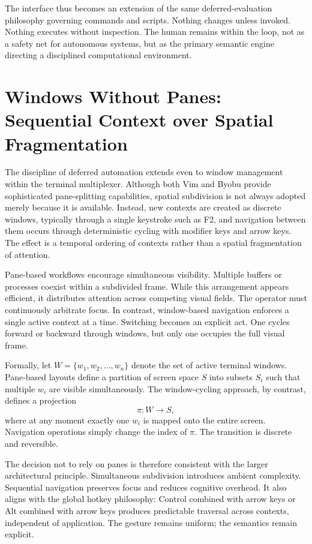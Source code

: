 \documentclass[11pt]{article}
\begin{document}
The interface thus becomes an extension of the same deferred-evaluation philosophy governing commands and scripts. Nothing changes unless invoked. Nothing executes without inspection. The human remains within the loop, not as a safety net for autonomous systems, but as the primary semantic engine directing a disciplined computational environment.

\section{Windows Without Panes: Sequential Context over Spatial Fragmentation}

The discipline of deferred automation extends even to window management within the terminal multiplexer. Although both Vim and Byobu provide sophisticated pane-splitting capabilities, spatial subdivision is not always adopted merely because it is available. Instead, new contexts are created as discrete windows, typically through a single keystroke such as F2, and navigation between them occurs through deterministic cycling with modifier keys and arrow keys. The effect is a temporal ordering of contexts rather than a spatial fragmentation of attention.

Pane-based workflows encourage simultaneous visibility. Multiple buffers or processes coexist within a subdivided frame. While this arrangement appears efficient, it distributes attention across competing visual fields. The operator must continuously arbitrate focus. In contrast, window-based navigation enforces a single active context at a time. Switching becomes an explicit act. One cycles forward or backward through windows, but only one occupies the full visual frame.

Formally, let \(W = \{w_1, w_2, \dots, w_n\}\) denote the set of active terminal windows. Pane-based layouts define a partition of screen space \(S\) into subsets \(S_i\) such that multiple \(w_i\) are visible simultaneously. The window-cycling approach, by contrast, defines a projection
\[
\pi : W \to S,
\]
where at any moment exactly one \(w_i\) is mapped onto the entire screen. Navigation operations simply change the index of \(\pi\). The transition is discrete and reversible.

The decision not to rely on panes is therefore consistent with the larger architectural principle. Simultaneous subdivision introduces ambient complexity. Sequential navigation preserves focus and reduces cognitive overhead. It also aligns with the global hotkey philosophy: Control combined with arrow keys or Alt combined with arrow keys produces predictable traversal across contexts, independent of application. The gesture remains uniform; the semantics remain explicit.
\end{document}
